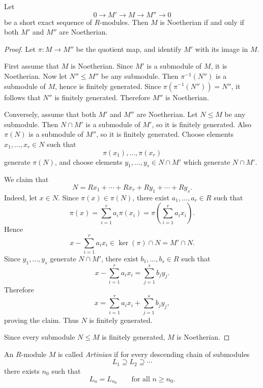 \begin{proposition}
    Let
    \[
        0\longrightarrow M' \longrightarrow M \longrightarrow M'' \longrightarrow 0
    \]
    be a short exact sequence of $R$-modules. Then $M$ is Noetherian if and only if both $M'$ and $M''$ are Noetherian.
\end{proposition}

\begin{proof}
    Let $\pi:M\to M''$ be the quotient map, and identify $M'$ with its image in $M$.

    First assume that $M$ is Noetherian. Since $M'$ is a submodule of $M$, it is
    Noetherian. Now let $N''\leq M''$ be any submodule. Then $\pi^{-1}(N'')$ is a
    submodule of $M$, hence is finitely generated. Since $\pi(\pi^{-1}(N''))=N''$,
    it follows that $N''$ is finitely generated. Therefore $M''$ is Noetherian.

    Conversely, assume that both $M'$ and $M''$ are Noetherian. Let $N\leq M$ be
    any submodule. Then $N\cap M'$ is a submodule of $M'$, so it is finitely
    generated. Also $\pi(N)$ is a submodule of $M''$, so it is finitely generated.
    Choose elements $x_1,\dots,x_r\in N$ such that
    \[
        \pi(x_1),\dots,\pi(x_r)
    \]
    generate $\pi(N)$, and choose elements $y_1,\dots,y_s\in N\cap M'$ which
    generate $N\cap M'$.

    We claim that
    \[
        N=Rx_1+\cdots+Rx_r+Ry_1+\cdots+Ry_s.
    \]
    Indeed, let $x\in N$. Since $\pi(x)\in \pi(N)$, there exist $a_1,\dots,a_r\in R$ such that
    \[
        \pi(x)=\sum_{i=1}^r a_i\pi(x_i)
        =\pi\!\left(\sum_{i=1}^r a_i x_i\right).
    \]
    Hence
    \[
        x-\sum_{i=1}^r a_i x_i \in \ker(\pi)\cap N = M'\cap N.
    \]
    Since $y_1,\dots,y_s$ generate $N\cap M'$, there exist $b_1,\dots,b_s\in R$ such
    that
    \[
        x-\sum_{i=1}^r a_i x_i=\sum_{j=1}^s b_j y_j.
    \]
    Therefore
    \[
        x=\sum_{i=1}^r a_i x_i+\sum_{j=1}^s b_j y_j,
    \]
    proving the claim. Thus $N$ is finitely generated.

    Since every submodule $N\leq M$ is finitely generated, $M$ is Noetherian.
\end{proof}

\begin{definition}
    An $R$-module $M$ is called \emph{Artinian} if for every descending chain of submodules
    \[
        L_1\supseteq L_2\supseteq \cdots
    \]
    there exists $n_0$ such that
    \[
        L_n=L_{n_0}\qquad \text{for all } n\ge n_0.
    \]
\end{definition}


